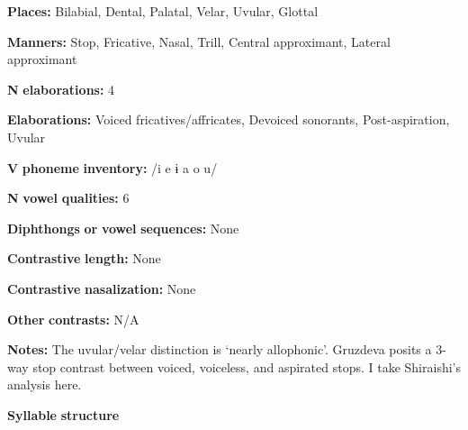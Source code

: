 \documentclass[output=paper]{langsci/langscibook}
\begin{document}
\begin{styleBody}
\textbf{Places:} Bilabial, Dental, Palatal, Velar, Uvular, Glottal
\end{styleBody}

\begin{styleBody}
\textbf{Manners:} Stop, Fricative, Nasal, Trill, Central approximant, Lateral approximant
\end{styleBody}

\begin{styleBody}
\textbf{N} \textbf{elaborations:} 4
\end{styleBody}

\begin{styleBody}
\textbf{Elaborations:} Voiced fricatives/affricates, Devoiced sonorants, Post-aspiration, Uvular
\end{styleBody}

\begin{styleBody}
\textbf{V} \textbf{phoneme} \textbf{inventory:} /i e ɨ a o u/
\end{styleBody}

\begin{styleBody}
\textbf{N} \textbf{vowel} \textbf{qualities:} 6
\end{styleBody}

\begin{styleBody}
\textbf{Diphthongs} \textbf{or} \textbf{vowel} \textbf{sequences:} None
\end{styleBody}

\begin{styleBody}
\textbf{Contrastive} \textbf{length:} None
\end{styleBody}

\begin{styleBody}
\textbf{Contrastive} \textbf{nasalization:} None
\end{styleBody}

\begin{styleBody}
\textbf{Other} \textbf{contrasts:} N/A
\end{styleBody}

\begin{styleBody}
\textbf{Notes:} The uvular/velar distinction is ‘nearly allophonic’. Gruzdeva posits a 3-way stop contrast between voiced, voiceless, and aspirated stops. I take Shiraishi’s analysis here.
\end{styleBody}

\begin{styleBody}
\textbf{Syllable} \textbf{structure}
\end{styleBody}
\end{document}
